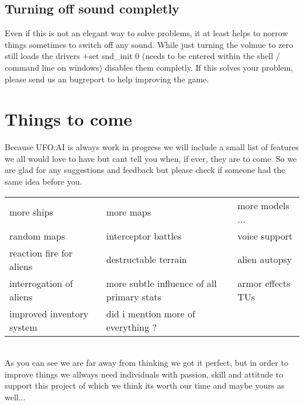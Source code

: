 \subsection{Turning off sound completly}
Even if this is not an elegant way to solve problems, it at least helps to norrow things sometimes to switch off any sound. While just turning the volmue to zero still loads the drivers +set snd\_init 0 (needs to be entered within the shell / command line on windows) disables them completly. If this solves your problem, please send us an bugreport to help improving the game.

\section{Things to come}
Because UFO:AI is always work in progress we will include a small list of features we all would love to have but cant tell you when, if ever, they are to come. So we are glad for any suggestions and feedback but please check if someone had the same idea before you.
\\
\begin{tabular}{lll}
more ships  & more maps & more models ...   \\ 
random maps & interceptor battles & voice support \\ 
reaction fire for aliens  & destructable terrain & alien autopsy \\ 
interrogation of aliens  & more subtle influence of all primary stats & armor effects TUs \\ 
improved inventory system & did i mention more of everything ? &  \\ 
\end{tabular} 
\\
As you can see we are far away from thinking we got it perfect, but in order to improve things we allways need individuals with passion, skill and attitude to support this project of which we think its worth our time and maybe yours as well...
